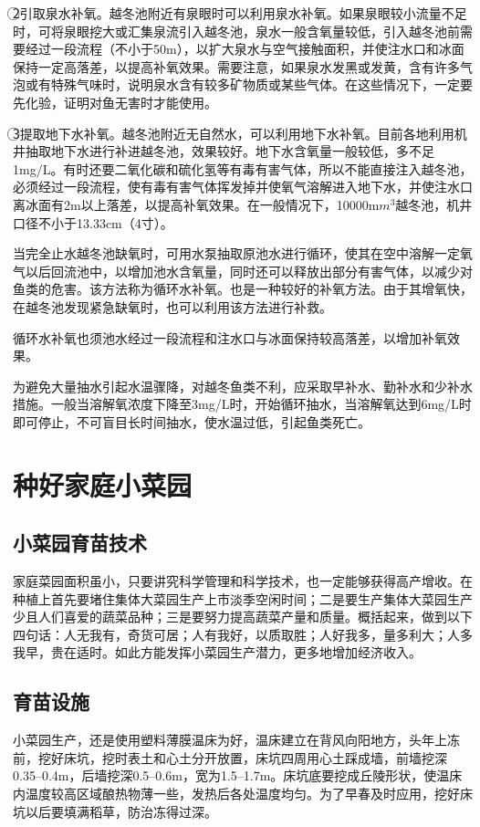 \documentclass{ctexbook}
\begin{document}
\textcircled{2}引取泉水补氧。越冬池附近有泉眼时可以利用泉水补氧。如果泉眼较小流量不足时，可将泉眼挖大或汇集泉流引入越冬池，泉水一般含氧量较低，引入越冬池前需要经过一段流程（不小于50m），以扩大泉水与空气接触面积，并使注水口和冰面保持一定高落差，以提高补氧效果。需要注意，如果泉水发黑或发黄，含有许多气泡或有特殊气味时，说明泉水含有较多矿物质或某些气体。在这些情况下，一定要先化验，证明对鱼无害时才能使用。

\textcircled{3}提取地下水补氧。越冬池附近无自然水，可以利用地下水补氧。目前各地利用机井抽取地下水进行补进越冬池，效果较好。地下水含氧量一般较低，多不足1mg/L。有时还要二氧化碳和硫化氢等有毒有害气体，所以不能直接注入越冬池，必须经过一段流程，使有毒有害气体挥发掉并使氧气溶解进入地下水，并使注水口离冰面有2m以上落差，以提高补氧效果。在一般情况下，10000m$m^{3}$越冬池，机井口径不小于13.33cm（4寸）。

当完全止水越冬池缺氧时，可用水泵抽取原池水进行循环，使其在空中溶解一定氧气以后回流池中，以增加池水含氧量，同时还可以释放出部分有害气体，以减少对鱼类的危害。该方法称为循环水补氧。也是一种较好的补氧方法。由于其增氧快，在越冬池发现紧急缺氧时，也可以利用该方法进行补救。

循环水补氧也须池水经过一段流程和注水口与冰面保持较高落差，以增加补氧效果。

为避免大量抽水引起水温骤降，对越冬鱼类不利，应采取早补水、勤补水和少补水措施。一般当溶解氧浓度下降至3mg/L时，开始循环抽水，当溶解氧达到6mg/L时即可停止，不可盲目长时间抽水，使水温过低，引起鱼类死亡。
\section{种好家庭小菜园}
\subsection{小菜园育苗技术}
家庭菜园面积虽小，只要讲究科学管理和科学技术，也一定能够获得高产增收。在种植上首先要堵住集体大菜园生产上市淡季空闲时间；二是要生产集体大菜园生产少且人们喜爱的蔬菜品种；三是要努力提高蔬菜产量和质量。概括起来，做到以下四句话：人无我有，奇货可居；人有我好，以质取胜；人好我多，量多利大；人多我早，贵在适时。如此方能发挥小菜园生产潜力，更多地增加经济收入。
\subsection{育苗设施}
小菜园生产，还是使用塑料薄膜温床为好，温床建立在背风向阳地方，头年上冻前，挖好床坑，挖时表土和心土分开放置，床坑四周用心土踩成墙，前墙挖深0.35--0.4m，后墙挖深0.5--0.6m，宽为1.5--1.7m。床坑底要挖成丘陵形状，使温床内温度较高区域酿热物薄一些，发热后各处温度均匀。为了早春及时应用，挖好床坑以后要填满稻草，防治冻得过深。
\end{document}
